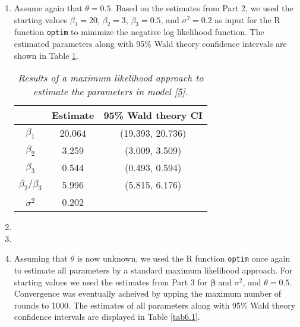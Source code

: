 \documentclass[12pt]{article}
\begin{document}
\begin{enumerate}
    \newpage
  \item Assume again that $\theta = 0.5$. Based on the estimates from Part 2, we used the starting values $\beta_1 = 20$, $\beta_2 = 3$, $\beta_3 =
    0.5$, and $\sigma^{2} = 0.2$ as input for the R function \texttt{optim} to minimize the negative log likelihood function.  The estimated
    parameters along with 95\% Wald theory confidence intervals are shown in Table \ref{tab3.1}.

    \begin{table}[h]
      \caption{\emph{Results of a maximum likelihood approach to estimate the parameters in model \eqref{5}.}}
      \vspace{.2cm}
      \centering
      \begin{tabular}{|c|c|c|}
        \hline
        & Estimate & 95\% Wald theory CI \\
        \hline
        $\beta_1$ & 20.064 & (19.393, 20.736) \\
        \hline
        $\beta_2$ & 3.259 & (3.009, 3.509) \\
        \hline
        $\beta_3$ & 0.544 & (0.493, 0.594) \\
        \hline
        $\beta_2 / \beta_3$ & 5.996 & (5.815, 6.176) \\
        \hline
        $\sigma^{2}$ & 0.202 & \\
        \hline
      \end{tabular}
      \label{tab3.1}
    \end{table}


  \item

  \item 

  \item Assuming that $\theta$ is now unknown, we used the R function \texttt{optim} once again to estimate all parameters by a standard maximum
    likelihood approach. For starting values we used the estimates from Part 3 for $\bm{\beta}$ and $\sigma^{2}$, and $\theta = 0.5$. Convergence was
    eventually acheived by upping the maximum number of rounds to 1000. The estimates of all parameters along with 95\% Wald theory confidence
    intervals are displayed in Table \ref{tab6.1}.


\end{enumerate}
\end{document}
